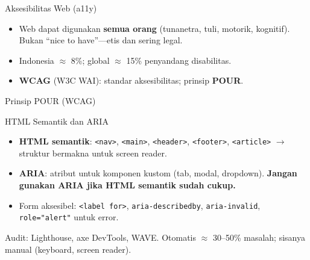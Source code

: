 \documentclass[handout]{beamer}
\begin{document}
\begin{frame}{Aksesibilitas Web (a11y)}
	\begin{itemize}
		\item Web dapat digunakan \textbf{semua orang} (tunanetra, tuli, motorik, kognitif). Bukan ``nice to have''---etis dan sering legal.
		\item Indonesia $\approx$ 8\%; global $\approx$ 15\% penyandang disabilitas.
		\item \textbf{WCAG} (W3C WAI): standar aksesibilitas; prinsip \textbf{POUR}.
	\end{itemize}
\end{frame}

\begin{frame}{Prinsip POUR (WCAG)}
\end{frame}

\begin{frame}{HTML Semantik dan ARIA}
	\begin{itemize}
		\item \textbf{HTML semantik}: \texttt{<nav>}, \texttt{<main>}, \texttt{<header>}, \texttt{<footer>}, \texttt{<article>} $\to$ struktur bermakna untuk screen reader.
		\item \textbf{ARIA}: atribut untuk komponen kustom (tab, modal, dropdown). \textbf{Jangan gunakan ARIA jika HTML semantik sudah cukup.}
		\item Form aksesibel: \texttt{<label for>}, \texttt{aria-describedby}, \texttt{aria-invalid}, \texttt{role="alert"} untuk error.
	\end{itemize}
	Audit: Lighthouse, axe DevTools, WAVE. Otomatis $\approx$ 30--50\% masalah; sisanya manual (keyboard, screen reader).
\end{frame}
\end{document}
